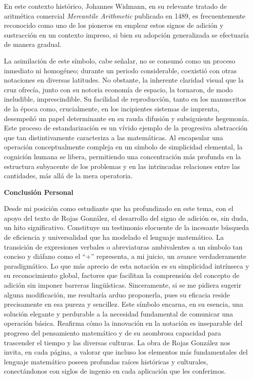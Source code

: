 \documentclass[11pt, a4paper]{article}
\begin{document}
En este contexto histórico, Johannes Widmann, en su relevante tratado de aritmética comercial \textit{Mercantile Arithmetic} publicado en 1489, es frecuentemente reconocido como uno de los pioneros en emplear estos signos de adición y sustracción en un contexto impreso, si bien su adopción generalizada se efectuaría de manera gradual.

La asimilación de este símbolo, cabe señalar, no se consumó como un proceso inmediato ni homogéneo; durante un periodo considerable, coexistió con otras notaciones en diversas latitudes. No obstante, la inherente claridad visual que la cruz ofrecía, junto con su notoria economía de espacio, la tornaron, de modo ineludible, imprescindible. Su facilidad de reproducción, tanto en los manuscritos de la época como, crucialmente, en los incipientes sistemas de imprenta, desempeñó un papel determinante en su rauda difusión y subsiguiente hegemonía. Este proceso de estandarización es un vívido ejemplo de la progresiva abstracción que tan distintivamente caracteriza a las matemáticas. Al encapsular una operación conceptualmente compleja en un símbolo de simplicidad elemental, la cognición humana se libera, permitiendo una concentración más profunda en la estructura subyacente de los problemas y en las intrincadas relaciones entre las cantidades, más allá de la mera operatoria.

\vspace*{1 cm}
\begin{center}
    {\fontsize{24}{26}\selectfont\textbf{Conclusión Personal}}
\end{center}
\vspace*{0.8em}

Desde mi posición como estudiante que ha profundizado en este tema, con el apoyo del texto de Rojas González, el desarrollo del signo de adición es, sin duda, un hito significativo. Constituye un testimonio elocuente de la incesante búsqueda de eficiencia y universalidad que ha modelado el lenguaje matemático. La transición de expresiones verbales o abreviaturas ambivalentes a un símbolo tan conciso y diáfano como el ``+'' representa, a mi juicio, un avance verdaderamente paradigmático. Lo que más aprecio de esta notación es su simplicidad intrínseca y su reconocimiento global, factores que facilitan la comprensión del concepto de adición sin imponer barreras lingüísticas. Sinceramente, si se me pidiera sugerir alguna modificación, me resultaría arduo proponerla, pues su eficacia reside precisamente en esa pureza y sencillez. Este símbolo encarna, en su esencia, una solución elegante y perdurable a la necesidad fundamental de comunicar una operación básica. Reafirma cómo la innovación en la notación es inseparable del progreso del pensamiento matemático y de su asombrosa capacidad para trascender el tiempo y las diversas culturas. La obra de Rojas González nos invita, en cada página, a valorar que incluso los elementos más fundamentales del lenguaje matemático poseen profundas raíces históricas y culturales, conectándonos con siglos de ingenio en cada aplicación que les conferimos.
\end{document}
